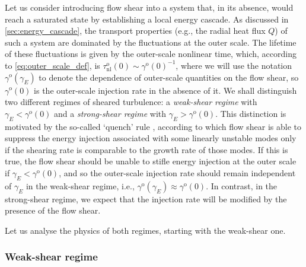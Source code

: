 \documentclass{jpp}
\newcommand{\gammao}{\gamma^\text{o}}
\newcommand{\taunloO}{\tau_{\text{nl}}^\text{o}(0)}
\newcommand{\gammaoO}{\gamma^\text{o}(0)}
\newcommand{\gammaE}{\gamma_{E}}
\begin{document}
Let us consider introducing flow shear into a system that, in its absence, would reach a saturated state by establishing a local energy cascade. As discussed in \cref{sec:energy_cascade}, the transport properties (e.g., the radial heat flux \(Q\)) of such a system are dominated by the fluctuations at the outer scale. The lifetime of these fluctuations is given by the outer-scale nonlinear time, which, according to \cref{eq:outer_scale_def}, is \(\taunloO \sim \gammaoO^{-1}\), where we will use the notation \(\gammao(\gammaE)\) to denote the dependence of outer-scale quantities on the flow shear, so \(\gammaoO\) is the outer-scale injection rate in the absence of it. We shall distinguish two different regimes of sheared turbulence: a \textit{weak-shear regime} with \mbox{\(\gammaE < \gammaoO\)} and a \textit{strong-shear regime} with \mbox{\(\gammaE > \gammaoO\)}. This distinction is motivated by the so-called `quench' rule \citep{waltz94, waltz98, kobayashi2012, ivanov20}, according to which flow shear is able to suppress the energy injection associated with some linearly unstable modes only if the shearing rate is comparable to the growth rate of those modes. If this is true, the flow shear should be unable to stifle energy injection at the outer scale if \(\gammaE < \gammaoO\), and so the outer-scale injection rate should remain independent of \(\gammaE\) in the weak-shear regime, i.e., \(\gammao(\gammaE) \approx \gammaoO\). In contrast, in the strong-shear regime, we expect that the injection rate will be modified by the presence of the flow shear.
 
Let us analyse the physics of both regimes, starting with the weak-shear one.

\subsubsection{Weak-shear regime}
\label{sec:weak_shear}
\end{document}
